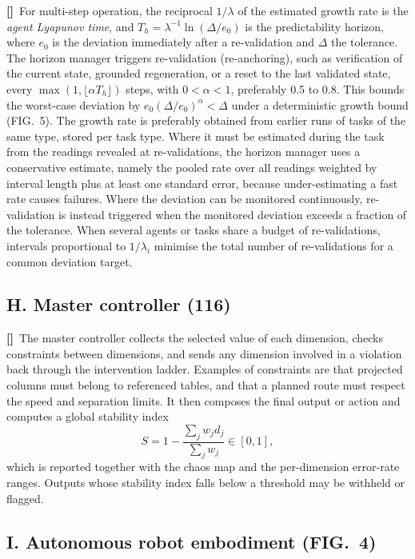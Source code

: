 \documentclass[12pt,a4paper]{article}
\newcounter{para}
\newcommand{\p}{\refstepcounter{para}\textbf{[\thepara]}\ }
\begin{document}
\p For multi-step operation, the reciprocal $1/\lambda$ of the estimated growth rate is the \emph{agent Lyapunov time}, and $T_h=\lambda^{-1}\ln(\Delta/e_0)$ is the predictability horizon, where $e_0$ is the deviation immediately after a re-validation and $\Delta$ the tolerance. The horizon manager triggers re-validation (re-anchoring), such as verification of the current state, grounded regeneration, or a reset to the last validated state, every $\max(1,\lfloor\alpha T_h\rfloor)$ steps, with $0<\alpha<1$, preferably 0.5 to 0.8. This bounds the worst-case deviation by $e_0(\Delta/e_0)^{\alpha}<\Delta$ under a deterministic growth bound (FIG.~5). The growth rate is preferably obtained from earlier runs of tasks of the same type, stored per task type. Where it must be estimated during the task from the readings revealed at re-validations, the horizon manager uses a conservative estimate, namely the pooled rate over all readings weighted by interval length plus at least one standard error, because under-estimating a fast rate causes failures. Where the deviation can be monitored continuously, re-validation is instead triggered when the monitored deviation exceeds a fraction of the tolerance. When several agents or tasks share a budget of re-validations, intervals proportional to $1/\lambda_i$ minimise the total number of re-validations for a common deviation target.

\subsection*{H. Master controller (116)}

\p The master controller collects the selected value of each dimension, checks constraints between dimensions, and sends any dimension involved in a violation back through the intervention ladder. Examples of constraints are that projected columns must belong to referenced tables, and that a planned route must respect the speed and separation limits. It then composes the final output or action and computes a global stability index
\[
S=1-\frac{\sum_j w_j d_j}{\sum_j w_j}\in[0,1],
\]
which is reported together with the chaos map and the per-dimension error-rate ranges. Outputs whose stability index falls below a threshold may be withheld or flagged.

\subsection*{I. Autonomous robot embodiment (FIG.~4)}
\end{document}
